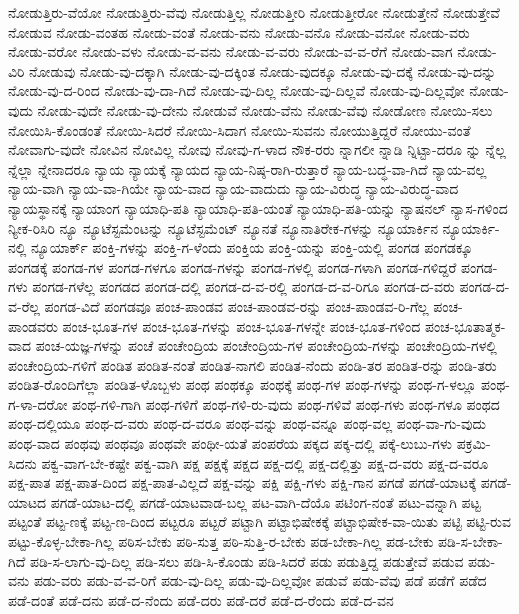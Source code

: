 {ನೋಡುತ್ತಿರು-ವೆಯೋ
ನೋಡುತ್ತಿರು-ವೆವು
ನೋಡುತ್ತಿಲ್ಲ
ನೋಡುತ್ತೀರಿ
ನೋಡುತ್ತೀರೋ
ನೋಡುತ್ತೇನೆ
ನೋಡುತ್ತೇವೆ
ನೋಡುವ
ನೋಡು-ವಂತಹ
ನೋಡು-ವಂತೆ
ನೋಡು-ವನು
ನೋಡು-ವನೊ
ನೋಡು-ವನೋ
ನೋಡು-ವರು
ನೋಡು-ವರೋ
ನೋಡು-ವಳು
ನೋಡು-ವ-ವನು
ನೋಡು-ವ-ವರು
ನೋಡು-ವ-ವ-ರೆಗೆ
ನೋಡು-ವಾಗ
ನೋಡು-ವಿರಿ
ನೋಡುವು
ನೋಡು-ವು-ದಕ್ಕಾಗಿ
ನೋಡು-ವು-ದಕ್ಕಿಂತ
ನೋಡು-ವುದಕ್ಕೂ
ನೋಡು-ವು-ದಕ್ಕೆ
ನೋಡು-ವು-ದನ್ನು
ನೋಡು-ವು-ದ-ರಿಂದ
ನೋಡು-ವು-ದಾ-ಗಿದೆ
ನೋಡು-ವು-ದಿಲ್ಲ
ನೋಡು-ವು-ದಿಲ್ಲವೆ
ನೋಡು-ವು-ದಿಲ್ಲವೋ
ನೋಡು-ವುದು
ನೋಡು-ವುದೇ
ನೋಡು-ವು-ದೇನು
ನೋಡುವೆ
ನೋಡು-ವೆನು
ನೋಡು-ವೆವು
ನೋಡೋಣ
ನೋಯಿ-ಸಲು
ನೋಯಿಸಿ-ಕೊಂಡಂತೆ
ನೋಯಿ-ಸಿದರೆ
ನೋಯಿ-ಸಿದಾಗ
ನೋಯಿ-ಸುವನು
ನೋಯುತ್ತಿದ್ದರೆ
ನೋಯು-ವಂತೆ
ನೋವಾಗು-ವುದೇ
ನೋವಿನ
ನೋವಿಲ್ಲ
ನೋವು
ನೋವು-ಗ-ಳಾದ
ನೌಕ-ರರು
ನ್ನಾಗಲೀ
ನ್ನಾಡಿ
ನ್ನಿಟ್ಟಾ-ದರೂ
ನ್ನು
ನ್ನೆಲ್ಲ
ನ್ನೆಲ್ಲಾ
ನ್ನೇನಾದರೂ
ನ್ಯಾಯ
ನ್ಯಾಯಕ್ಕೆ
ನ್ಯಾಯದ
ನ್ಯಾಯ-ನಿಷ್ಠ-ರಾಗಿ-ರುತ್ತಾರೆ
ನ್ಯಾಯ-ಬದ್ಧ-ವಾ-ಗಿದೆ
ನ್ಯಾಯ-ವಲ್ಲ
ನ್ಯಾಯ-ವಾಗಿ
ನ್ಯಾಯ-ವಾ-ಗಿಯೇ
ನ್ಯಾಯ-ವಾದ
ನ್ಯಾಯ-ವಾದುದು
ನ್ಯಾಯ-ವಿರುದ್ಧ
ನ್ಯಾಯ-ವಿರುದ್ಧ-ವಾದ
ನ್ಯಾಯಸ್ಥಾನಕ್ಕೆ
ನ್ಯಾಯಾಂಗ
ನ್ಯಾಯಾಧಿ-ಪತಿ
ನ್ಯಾಯಾಧಿ-ಪತಿ-ಯಂತೆ
ನ್ಯಾಯಾಧಿ-ಪತಿ-ಯನ್ನು
ನ್ಯಾಷನಲ್
ನ್ಯಾಸ-ಗಳಿಂದ
ನ್ಯೀಕ-ರಿಸಿರಿ
ನ್ಯೂ
ನ್ಯೂಟೆಸ್ಟಮೆಂಟನ್ನು
ನ್ಯೂಟೆಸ್ಟಮೆಂಟ್
ನ್ಯೂನತೆ
ನ್ಯೂನಾತಿರೇಕ-ಗಳನ್ನು
ನ್ಯೂಯಾರ್ಕಿನ
ನ್ಯೂಯಾರ್ಕಿ-ನಲ್ಲಿ
ನ್ಯೂಯಾರ್ಕ್
ಪಂಕ್ತಿ-ಗಳನ್ನು
ಪಂಕ್ತಿ-ಗ-ಳೆಂದು
ಪಂಕ್ತಿಯ
ಪಂಕ್ತಿ-ಯನ್ನು
ಪಂಕ್ತಿ-ಯಲ್ಲಿ
ಪಂಗಡ
ಪಂಗಡಕ್ಕೂ
ಪಂಗಡಕ್ಕೆ
ಪಂಗಡ-ಗಳ
ಪಂಗಡ-ಗಳಗೂ
ಪಂಗಡ-ಗಳನ್ನು
ಪಂಗಡ-ಗಳಲ್ಲಿ
ಪಂಗಡ-ಗಳಾಗಿ
ಪಂಗಡ-ಗಳಿದ್ದರೆ
ಪಂಗಡ-ಗಳು
ಪಂಗಡ-ಗಳೆಲ್ಲ
ಪಂಗಡದ
ಪಂಗಡ-ದಲ್ಲಿ
ಪಂಗಡ-ದ-ವ-ರಲ್ಲಿ
ಪಂಗಡ-ದ-ವ-ರಿಗೂ
ಪಂಗಡ-ದ-ವರು
ಪಂಗಡ-ದ-ವ-ರೆಲ್ಲ
ಪಂಗಡ-ವಿದೆ
ಪಂಗಡವೂ
ಪಂಚ-ಪಾಂಡವ
ಪಂಚ-ಪಾಂಡವ-ರನ್ನು
ಪಂಚ-ಪಾಂಡವ-ರಿ-ಗೆಲ್ಲ
ಪಂಚ-ಪಾಂಡವರು
ಪಂಚ-ಭೂತ-ಗಳ
ಪಂಚ-ಭೂತ-ಗಳನ್ನು
ಪಂಚ-ಭೂತ-ಗಳನ್ನೇ
ಪಂಚ-ಭೂತ-ಗಳಿಂದ
ಪಂಚ-ಭೂತಾತ್ಮಕ-ವಾದ
ಪಂಚ-ಯಜ್ಞ-ಗಳನ್ನು
ಪಂಚೆ
ಪಂಚೇಂದ್ರಿಯ
ಪಂಚೇಂದ್ರಿಯ-ಗಳ
ಪಂಚೇಂದ್ರಿಯ-ಗಳನ್ನು
ಪಂಚೇಂದ್ರಿಯ-ಗಳಲ್ಲಿ
ಪಂಚೇಂದ್ರಿಯ-ಗಳಿಗೆ
ಪಂಡಿತ
ಪಂಡಿತ-ನಂತೆ
ಪಂಡಿತ-ನಾಗಲಿ
ಪಂಡಿತ-ನೆಂದು
ಪಂಡಿ-ತರ
ಪಂಡಿತ-ರನ್ನು
ಪಂಡಿ-ತರು
ಪಂಡಿತ-ರೊಂದಿಗೆಲ್ಲಾ
ಪಂಡಿತ-ಳೊಬ್ಬಳು
ಪಂಥ
ಪಂಥಕ್ಕೂ
ಪಂಥಕ್ಕೆ
ಪಂಥ-ಗಳ
ಪಂಥ-ಗಳನ್ನು
ಪಂಥ-ಗ-ಳಲ್ಲೂ
ಪಂಥ-ಗ-ಳಾ-ದರೋ
ಪಂಥ-ಗಳಿ-ಗಾಗಿ
ಪಂಥ-ಗಳಿಗೆ
ಪಂಥ-ಗಳಿ-ರು-ವುದು
ಪಂಥ-ಗಳಿವೆ
ಪಂಥ-ಗಳು
ಪಂಥ-ಗಳೂ
ಪಂಥದ
ಪಂಥ-ದಲ್ಲಿಯೂ
ಪಂಥ-ದ-ವರು
ಪಂಥ-ದ-ವರೂ
ಪಂಥ-ವನ್ನು
ಪಂಥ-ವನ್ನೂ
ಪಂಥ-ವಲ್ಲ
ಪಂಥ-ವಾ-ಗು-ವುದು
ಪಂಥ-ವಾದ
ಪಂಥವು
ಪಂಥವೂ
ಪಂಥವೇ
ಪಂಥೀ-ಯತೆ
ಪಂಪರೆಯ
ಪಕ್ಕದ
ಪಕ್ಕ-ದಲ್ಲಿ
ಪಕ್ಕೆ-ಲುಬು-ಗಳು
ಪಕ್ರಮಿ-ಸಿದನು
ಪಕ್ವ-ವಾಗ-ಬೇ-ಕಷ್ಟೇ
ಪಕ್ವ-ವಾಗಿ
ಪಕ್ಷ
ಪಕ್ಷಕ್ಕೆ
ಪಕ್ಷದ
ಪಕ್ಷ-ದಲ್ಲಿ
ಪಕ್ಷ-ದಲ್ಲಿತ್ತು
ಪಕ್ಷ-ದ-ವರು
ಪಕ್ಷ-ದ-ವರೂ
ಪಕ್ಷ-ಪಾತ
ಪಕ್ಷ-ಪಾತ-ದಿಂದ
ಪಕ್ಷ-ಪಾತ-ವಿಲ್ಲದೆ
ಪಕ್ಷ-ವನ್ನು
ಪಕ್ಷಿ
ಪಕ್ಷಿ-ಗಳು
ಪಕ್ಷಿ-ಗಾನ
ಪಗಡೆ
ಪಗಡೆ-ಯಾಟಕ್ಕೆ
ಪಗಡೆ-ಯಾಟದ
ಪಗಡೆ-ಯಾಟ-ದಲ್ಲಿ
ಪಗಡೆ-ಯಾಟವಾಡ-ಬಲ್ಲ
ಪಟ-ವಾಗಿ-ದೆಯೊ
ಪಟಿಂಗ-ನಂತೆ
ಪಟು-ವನ್ನಾಗಿ
ಪಟ್ಟ
ಪಟ್ಟಂತೆ
ಪಟ್ಟ-ಣಕ್ಕೆ
ಪಟ್ಟ-ಣ-ದಿಂದ
ಪಟ್ಟರೂ
ಪಟ್ಟರೆ
ಪಟ್ಟಾಗಿ
ಪಟ್ಟಾಭಿಷೇಕಕ್ಕೆ
ಪಟ್ಟಾಭಿಷೇಕ-ವಾ-ಯಿತು
ಪಟ್ಟಿ
ಪಟ್ಟಿ-ರುವ
ಪಟ್ಟು-ಕೊಳ್ಳ-ಬೇಕಾ-ಗಿಲ್ಲ
ಪಠಿಸ-ಬೇಕು
ಪಠಿ-ಸುತ್ತ
ಪಠಿ-ಸುತ್ತಿ-ರ-ಬೇಕು
ಪಡ-ಬೇಕಾ-ಗಿಲ್ಲ
ಪಡ-ಬೇಕು
ಪಡಿ-ಸ-ಬೇಕಾ-ಗಿದೆ
ಪಡಿ-ಸ-ಲಾಗು-ವು-ದಿಲ್ಲ
ಪಡಿ-ಸಲು
ಪಡಿ-ಸಿ-ಕೊಂಡು
ಪಡಿ-ಸಿದರೆ
ಪಡು
ಪಡುತ್ತಿದ್ದ
ಪಡುತ್ತೇವೆ
ಪಡುವ
ಪಡು-ವನು
ಪಡು-ವರು
ಪಡು-ವ-ವ-ರಿಗೆ
ಪಡು-ವು-ದಿಲ್ಲ
ಪಡು-ವು-ದಿಲ್ಲವೋ
ಪಡುವೆ
ಪಡು-ವೆವು
ಪಡೆ
ಪಡೆಗೆ
ಪಡೆದ
ಪಡೆ-ದಂತೆ
ಪಡೆ-ದನು
ಪಡೆ-ದ-ನೆಂದು
ಪಡೆ-ದರು
ಪಡೆ-ದರೆ
ಪಡೆ-ದ-ರೆಂದು
ಪಡೆ-ದ-ವನ
}

